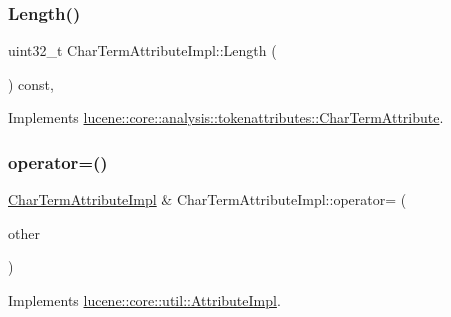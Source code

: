 \subsubsection{\texorpdfstring{Length()}{Length()}}
{\footnotesize\ttfamily uint32\+\_\+t Char\+Term\+Attribute\+Impl\+::\+Length (\begin{DoxyParamCaption}{ }\end{DoxyParamCaption}) const\hspace{0.3cm}{\ttfamily [override]}, {\ttfamily [virtual]}}



Implements \mbox{\hyperlink{classlucene_1_1core_1_1analysis_1_1tokenattributes_1_1CharTermAttribute_a1e81ad4ff6bc6141f5a6e103cdf7f36d}{lucene\+::core\+::analysis\+::tokenattributes\+::\+Char\+Term\+Attribute}}.

\mbox{\label{classlucene_1_1core_1_1analysis_1_1tokenattributes_1_1CharTermAttributeImpl_ac49b714c3f8e438ddaa27dc1a2421144}} 
\subsubsection{\texorpdfstring{operator=()}{operator=()}\hspace{0.1cm}{\footnotesize\ttfamily [1/2]}}
{\footnotesize\ttfamily \mbox{\hyperlink{classlucene_1_1core_1_1analysis_1_1tokenattributes_1_1CharTermAttributeImpl}{Char\+Term\+Attribute\+Impl}} \& Char\+Term\+Attribute\+Impl\+::operator= (\begin{DoxyParamCaption}\item[{const \mbox{\hyperlink{classlucene_1_1core_1_1util_1_1AttributeImpl}{lucene\+::core\+::util\+::\+Attribute\+Impl}} \&}]{other }\end{DoxyParamCaption})\hspace{0.3cm}{\ttfamily [virtual]}}



Implements \mbox{\hyperlink{classlucene_1_1core_1_1util_1_1AttributeImpl_ab032e399d03ce2f58c76881cf2b92325}{lucene\+::core\+::util\+::\+Attribute\+Impl}}.



